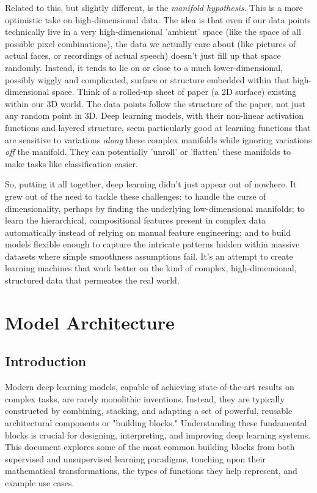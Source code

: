 \documentclass{article}
\begin{document}
Related to this, but slightly different, is the \emph{manifold hypothesis}. This is a more optimistic take on high-dimensional data. The idea is that even if our data points technically live in a very high-dimensional 'ambient' space (like the space of all possible pixel combinations), the data we actually care about (like pictures of actual faces, or recordings of actual speech) doesn't just fill up that space randomly. Instead, it tends to lie on or close to a much lower-dimensional, possibly wiggly and complicated, surface or structure embedded within that high-dimensional space. Think of a rolled-up sheet of paper (a 2D surface) existing within our 3D world. The data points follow the structure of the paper, not just any random point in 3D. Deep learning models, with their non-linear activation functions and layered structure, seem particularly good at learning functions that are sensitive to variations \emph{along} these complex manifolds while ignoring variations \emph{off} the manifold. They can potentially 'unroll' or 'flatten' these manifolds to make tasks like classification easier.

So, putting it all together, deep learning didn't just appear out of nowhere. It grew out of the need to tackle these challenges: to handle the curse of dimensionality, perhaps by finding the underlying low-dimensional manifolds; to learn the hierarchical, compositional features present in complex data automatically instead of relying on manual feature engineering; and to build models flexible enough to capture the intricate patterns hidden within massive datasets where simple smoothness assumptions fail. It's an attempt to create learning machines that work better on the kind of complex, high-dimensional, structured data that permeates the real world.




\section{Model Architecture}

\subsection{Introduction}

Modern deep learning models, capable of achieving state-of-the-art results on complex tasks, are rarely monolithic inventions. Instead, they are typically constructed by combining, stacking, and adapting a set of powerful, reusable architectural components or "building blocks." Understanding these fundamental blocks is crucial for designing, interpreting, and improving deep learning systems. This document explores some of the most common building blocks from both supervised and unsupervised learning paradigms, touching upon their mathematical transformations, the types of functions they help represent, and example use cases.
\end{document}
